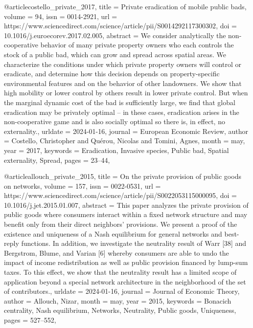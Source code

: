 {{{@article{costello_private_2017,
	title = {Private eradication of mobile public bads},
	volume = {94},
	issn = {0014-2921},
	url = {https://www.sciencedirect.com/science/article/pii/S0014292117300302},
	doi = {10.1016/j.euroecorev.2017.02.005},
	abstract = {We consider analytically the non-cooperative behavior of many private property owners who each controls the stock of a public bad, which can grow and spread across spatial areas. We characterize the conditions under which private property owners will control or eradicate, and determine how this decision depends on property-specific environmental features and on the behavior of other landowners. We show that high mobility or lower control by others result in lower private control. But when the marginal dynamic cost of the bad is sufficiently large, we find that global eradication may be privately optimal – in these cases, eradication arises in the non-cooperative game and is also socially optimal so there is, in effect, no externality.},
	urldate = {2024-01-16},
	journal = {European Economic Review},
	author = {Costello, Christopher and Quérou, Nicolas and Tomini, Agnes},
	month = may,
	year = {2017},
	keywords = {Eradication, Invasive species, Public bad, Spatial externality, Spread},
	pages = {23--44},
}

@article{allouch_private_2015,
	title = {On the private provision of public goods on networks},
	volume = {157},
	issn = {0022-0531},
	url = {https://www.sciencedirect.com/science/article/pii/S0022053115000095},
	doi = {10.1016/j.jet.2015.01.007},
	abstract = {This paper analyzes the private provision of public goods where consumers interact within a fixed network structure and may benefit only from their direct neighbors' provisions. We present a proof of the existence and uniqueness of a Nash equilibrium for general networks and best-reply functions. In addition, we investigate the neutrality result of Warr [38] and Bergstrom, Blume, and Varian [6] whereby consumers are able to undo the impact of income redistribution as well as public provision financed by lump-sum taxes. To this effect, we show that the neutrality result has a limited scope of application beyond a special network architecture in the neighborhood of the set of contributors.},
	urldate = {2024-01-16},
	journal = {Journal of Economic Theory},
	author = {Allouch, Nizar},
	month = may,
	year = {2015},
	keywords = {Bonacich centrality, Nash equilibrium, Networks, Neutrality, Public goods, Uniqueness},
	pages = {527--552},
}

}}}
